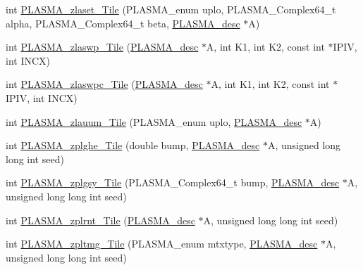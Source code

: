 \begin{DoxyCompactItemize}
\item 
int \hyperlink{group__PLASMA__Complex64__t__Tile_gab13674b53c6109c3da58d05a35e5a990_gab13674b53c6109c3da58d05a35e5a990}{P\+L\+A\+S\+M\+A\+\_\+zlaset\+\_\+\+Tile} (P\+L\+A\+S\+M\+A\+\_\+enum uplo, P\+L\+A\+S\+M\+A\+\_\+\+Complex64\+\_\+t alpha, P\+L\+A\+S\+M\+A\+\_\+\+Complex64\+\_\+t beta, \hyperlink{structplasma__desc__t}{P\+L\+A\+S\+M\+A\+\_\+desc} $\ast$A)
\item 
int \hyperlink{group__PLASMA__Complex64__t__Tile_ga61271c8d3fabfe43caf0f8f0fb511b82_ga61271c8d3fabfe43caf0f8f0fb511b82}{P\+L\+A\+S\+M\+A\+\_\+zlaswp\+\_\+\+Tile} (\hyperlink{structplasma__desc__t}{P\+L\+A\+S\+M\+A\+\_\+desc} $\ast$A, int K1, int K2, const int $\ast$I\+P\+I\+V, int I\+N\+C\+X)
\item 
int \hyperlink{group__PLASMA__Complex64__t__Tile_gacf2d5a0f53cf1d2b24fe7f29fc7dc434_gacf2d5a0f53cf1d2b24fe7f29fc7dc434}{P\+L\+A\+S\+M\+A\+\_\+zlaswpc\+\_\+\+Tile} (\hyperlink{structplasma__desc__t}{P\+L\+A\+S\+M\+A\+\_\+desc} $\ast$A, int K1, int K2, const int $\ast$I\+P\+I\+V, int I\+N\+C\+X)
\item 
int \hyperlink{group__PLASMA__Complex64__t__Tile_ga50322b286ba5e26cfa918ed2be8860c9_ga50322b286ba5e26cfa918ed2be8860c9}{P\+L\+A\+S\+M\+A\+\_\+zlauum\+\_\+\+Tile} (P\+L\+A\+S\+M\+A\+\_\+enum uplo, \hyperlink{structplasma__desc__t}{P\+L\+A\+S\+M\+A\+\_\+desc} $\ast$A)
\item 
int \hyperlink{group__PLASMA__Complex64__t__Tile_gaf494256f8af8223468c1e0a2315dbfb7_gaf494256f8af8223468c1e0a2315dbfb7}{P\+L\+A\+S\+M\+A\+\_\+zplghe\+\_\+\+Tile} (double bump, \hyperlink{structplasma__desc__t}{P\+L\+A\+S\+M\+A\+\_\+desc} $\ast$A, unsigned long long int seed)
\item 
int \hyperlink{group__PLASMA__Complex64__t__Tile_ga5009d502bba79bde803f883aff293921_ga5009d502bba79bde803f883aff293921}{P\+L\+A\+S\+M\+A\+\_\+zplgsy\+\_\+\+Tile} (P\+L\+A\+S\+M\+A\+\_\+\+Complex64\+\_\+t bump, \hyperlink{structplasma__desc__t}{P\+L\+A\+S\+M\+A\+\_\+desc} $\ast$A, unsigned long long int seed)
\item 
int \hyperlink{group__PLASMA__Complex64__t__Tile_ga7e7cf88c4295f8b364b66cbadd023557_ga7e7cf88c4295f8b364b66cbadd023557}{P\+L\+A\+S\+M\+A\+\_\+zplrnt\+\_\+\+Tile} (\hyperlink{structplasma__desc__t}{P\+L\+A\+S\+M\+A\+\_\+desc} $\ast$A, unsigned long long int seed)
\item 
int \hyperlink{group__PLASMA__Complex64__t__Tile_ga2141cd6e8e8ebd462668c43d8f09f468_ga2141cd6e8e8ebd462668c43d8f09f468}{P\+L\+A\+S\+M\+A\+\_\+zpltmg\+\_\+\+Tile} (P\+L\+A\+S\+M\+A\+\_\+enum mtxtype, \hyperlink{structplasma__desc__t}{P\+L\+A\+S\+M\+A\+\_\+desc} $\ast$A, unsigned long long int seed)

\end{DoxyCompactItemize}
